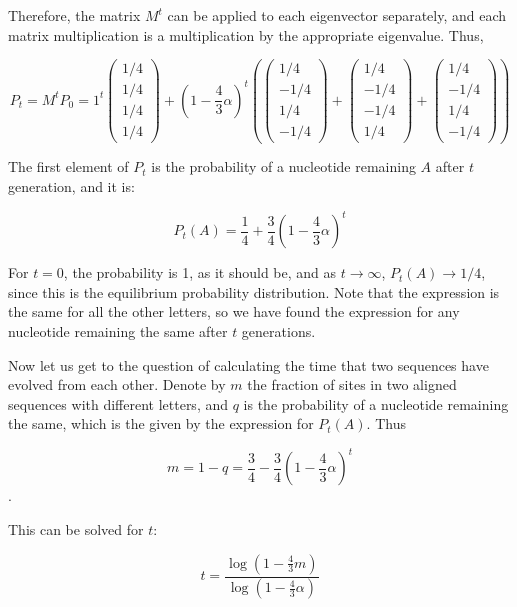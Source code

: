 \documentclass[
  letterpaper,
  DIV=11,
  numbers=noendperiod]{scrreprt}
\begin{document}
Therefore, the matrix \(M^t\) can be applied to each eigenvector
separately, and each matrix multiplication is a multiplication by the
appropriate eigenvalue. Thus,

\[ 
P_t = M^t P_0 =   1^t \left(\begin{array}{c} 1/4 \\ 1/4 \\ 1/4 \\ 1/4 \end{array}\right) + (1-\frac{4}{3}\alpha)^t\left( \left(\begin{array}{c} 1/4 \\ -1/4 \\ 1/4 \\ -1/4 \end{array}\right) +  \left(\begin{array}{c} 1/4 \\ -1/4 \\ -1/4 \\ 1/4 \end{array}\right) + \left(\begin{array}{c} 1/4 \\ -1/4 \\ 1/4 \\ -1/4 \end{array}\right) \right)
\]

The first element of \(P_t\) is the probability of a nucleotide
remaining \(A\) after \(t\) generation, and it is:

\[
P_t(A) = \frac{1}{4} + \frac{3}{4}\left(1-\frac{4}{3}\alpha\right)^t
\]

For \(t=0\), the probability is 1, as it should be, and as
\(t \rightarrow \infty\), \(P_t(A) \rightarrow 1/4\), since this is the
equilibrium probability distribution. Note that the expression is the
same for all the other letters, so we have found the expression for any
nucleotide remaining the same after \(t\) generations.

Now let us get to the question of calculating the time that two
sequences have evolved from each other. Denote by \(m\) the fraction of
sites in two aligned sequences with different letters, and \(q\) is the
probability of a nucleotide remaining the same, which is the given by
the expression for \(P_t(A)\). Thus

\[
m = 1 - q = \frac{3}{4} - \frac{3}{4}\left(1-\frac{4}{3}\alpha\right)^t
\].

This can be solved for \(t\):

\[ 
t = \frac{\log (1 - \frac{4}{3}m)}{\log (1 - \frac{4}{3} \alpha)}
\]
\end{document}
